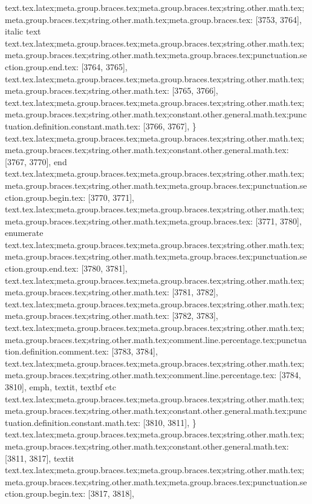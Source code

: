 {{{{{{{{{{{{{{{{{{{{{{{{{{{{{{{{{{{{{{{{{{{{{{{{{{{{{{{{{{{{{{{{{{{{{{{{{{{{{{{{{{{{{{{{{{{{{{{{{{{{{{{{{{{{{{{{{{{{{{{{text.tex.latex;meta.group.braces.tex;meta.group.braces.tex;string.other.math.tex;meta.group.braces.tex;string.other.math.tex;meta.group.braces.tex: [3753, 3764], {italic text}
text.tex.latex;meta.group.braces.tex;meta.group.braces.tex;string.other.math.tex;meta.group.braces.tex;string.other.math.tex;meta.group.braces.tex;punctuation.section.group.end.tex: [3764, 3765], {}}
text.tex.latex;meta.group.braces.tex;meta.group.braces.tex;string.other.math.tex;meta.group.braces.tex;string.other.math.tex: [3765, 3766], {
}
text.tex.latex;meta.group.braces.tex;meta.group.braces.tex;string.other.math.tex;meta.group.braces.tex;string.other.math.tex;constant.other.general.math.tex;punctuation.definition.constant.math.tex: [3766, 3767], {\}
text.tex.latex;meta.group.braces.tex;meta.group.braces.tex;string.other.math.tex;meta.group.braces.tex;string.other.math.tex;constant.other.general.math.tex: [3767, 3770], {end}
text.tex.latex;meta.group.braces.tex;meta.group.braces.tex;string.other.math.tex;meta.group.braces.tex;string.other.math.tex;meta.group.braces.tex;punctuation.section.group.begin.tex: [3770, 3771], {{}
text.tex.latex;meta.group.braces.tex;meta.group.braces.tex;string.other.math.tex;meta.group.braces.tex;string.other.math.tex;meta.group.braces.tex: [3771, 3780], {enumerate}
text.tex.latex;meta.group.braces.tex;meta.group.braces.tex;string.other.math.tex;meta.group.braces.tex;string.other.math.tex;meta.group.braces.tex;punctuation.section.group.end.tex: [3780, 3781], {}}
text.tex.latex;meta.group.braces.tex;meta.group.braces.tex;string.other.math.tex;meta.group.braces.tex;string.other.math.tex: [3781, 3782], {
}
text.tex.latex;meta.group.braces.tex;meta.group.braces.tex;string.other.math.tex;meta.group.braces.tex;string.other.math.tex: [3782, 3783], {
}
text.tex.latex;meta.group.braces.tex;meta.group.braces.tex;string.other.math.tex;meta.group.braces.tex;string.other.math.tex;comment.line.percentage.tex;punctuation.definition.comment.tex: [3783, 3784], {%
text.tex.latex;meta.group.braces.tex;meta.group.braces.tex;string.other.math.tex;meta.group.braces.tex;string.other.math.tex;comment.line.percentage.tex: [3784, 3810], { emph, textit, textbf etc
}
text.tex.latex;meta.group.braces.tex;meta.group.braces.tex;string.other.math.tex;meta.group.braces.tex;string.other.math.tex;constant.other.general.math.tex;punctuation.definition.constant.math.tex: [3810, 3811], {\}
text.tex.latex;meta.group.braces.tex;meta.group.braces.tex;string.other.math.tex;meta.group.braces.tex;string.other.math.tex;constant.other.general.math.tex: [3811, 3817], {textit}
text.tex.latex;meta.group.braces.tex;meta.group.braces.tex;string.other.math.tex;meta.group.braces.tex;string.other.math.tex;meta.group.braces.tex;punctuation.section.group.begin.tex: [3817, 3818], {{}
}}}}}}}}}}}}}}}}}}}}}}}}}}}}}}}}}}}}}}}}}}}}}}}}}}}}}}}}}}}}}}}}}}}}}}}}}}}}}}}}}}}}}}}}}}}}}}}}}}}}}}}}}}}}}}}}}}}}}}}}}}}
